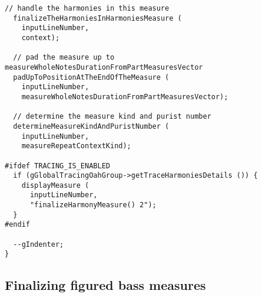 \begin{lstlisting}[language=CPlusPlus]
  // handle the harmonies in this measure
  finalizeTheHarmoniesInHarmoniesMeasure (
    inputLineNumber,
    context);

  // pad the measure up to measureWholeNotesDurationFromPartMeasuresVector
  padUpToPositionAtTheEndOfTheMeasure (
    inputLineNumber,
    measureWholeNotesDurationFromPartMeasuresVector);

  // determine the measure kind and purist number
  determineMeasureKindAndPuristNumber (
    inputLineNumber,
    measureRepeatContextKind);

#ifdef TRACING_IS_ENABLED
  if (gGlobalTracingOahGroup->getTraceHarmoniesDetails ()) {
    displayMeasure (
      inputLineNumber,
      "finalizeHarmonyMeasure() 2");
  }
#endif

  --gIndenter;
}
\end{lstlisting}


\subsection{Finalizing figured bass measures}

